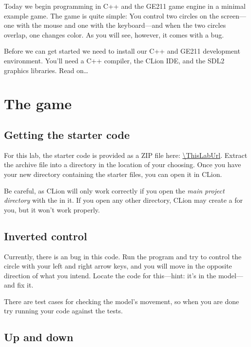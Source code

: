 \documentclass{tufte-handout}
\begin{document}
\maketitle

Today we begin programming in C++ and the GE211 game engine in a minimal
example game. The game is quite simple: You control two circles on the
screen---one with the mouse and one with the keyboard---and when the two
circles overlap, one changes color. As you will see, however, it comes
with a bug.

Before we can get started we need to install our C++ and GE211
development environment. You'll need a C++ compiler, the CLion IDE, and
the SDL2 graphics libraries. Read on\ldots

\section{The game}

\subsection{Getting the starter code}

For this lab, the starter code is provided as a ZIP file here:
\url{\ThisLabUrl}. Extract the archive file into a directory in the
location of your choosing. Once you have your new directory containing
the starter files, you can open it in CLion.

Be careful, as CLion will only work correctly if you open the \emph{main
project directory} with the  in it. If you open
any other directory, CLion may create a  for
you, but it won't work properly.

\subsection{Inverted control}

Currently, there is an bug in this code. Run the program and try to
control the circle with your left and right arrow keys, and you will
move in the opposite direction of what you intend. Locate the code for
this---hint: it's in the model---and fix it.

There are test cases for checking the model's movement, so when you are
done try running your code against the tests.

\subsection{Up and down}
\end{document}

